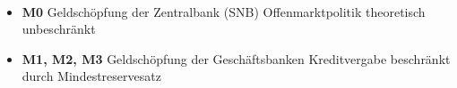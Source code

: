 \begin{minipage}{0.4\linewidth}
	\vspace{-12em}
	\\
	\begin{itemize}
		\item \textbf{M0}
		\subitem Geldschöpfung der Zentralbank (SNB)
		\subitem Offenmarktpolitik
		\subitem theoretisch unbeschränkt
		\item \textbf{M1, M2, M3}
		\subitem Geldschöpfung der Geschäftsbanken
		\subitem Kreditvergabe
		\subitem beschränkt durch Mindestreservesatz
	\end{itemize}
	\vfill
\end{minipage}


